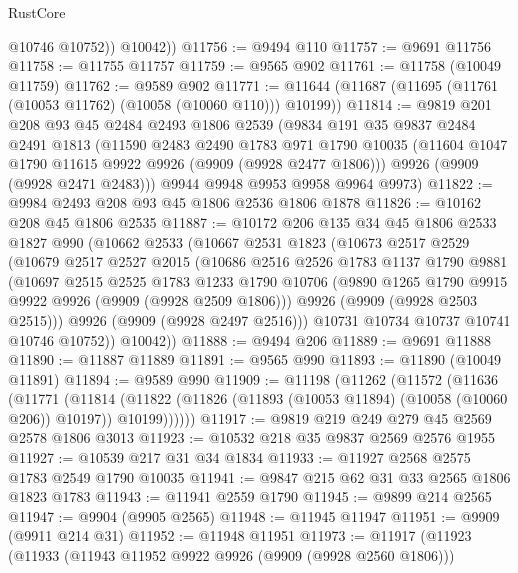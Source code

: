 \begin{lexlean}{RustCore}
\begin{coremodule}
            @10746
            @10752))
        @10042))
@11756 := @9494 @110
@11757 := @9691 @11756
@11758 := @11755 @11757
@11759 := @9565 @902
@11761 := @11758 (@10049 @11759)
@11762 := @9589 @902
@11771 := @11644 (@11687 (@11695 (@11761 (@10053 @11762) (@10058 (@10060 @110))) @10199))
@11814 := @9819
    @201
    @208
    @93
    @45
    @2484
    @2493
    @1806
    @2539
    (@9834
      @191
      @35
      @9837
      @2484
      @2491
      @1813
      (@11590
        @2483
        @2490
        @1783
        @971
        @1790
        @10035
        (@11604 @1047 @1790 @11615 @9922 @9926 (@9909 (@9928 @2477 @1806)))
        @9926
        (@9909 (@9928 @2471 @2483)))
      @9944
      @9948
      @9953
      @9958
      @9964
      @9973)
@11822 := @9984 @2493 @208 @93 @45 @1806 @2536 @1806 @1878
@11826 := @10162 @208 @45 @1806 @2535
@11887 := @10172
    @206
    @135
    @34
    @45
    @1806
    @2533
    @1827
    @990
    (@10662
      @2533
      (@10667
        @2531
        @1823
        (@10673
          @2517
          @2529
          (@10679
            @2517
            @2527
            @2015
            (@10686
              @2516
              @2526
              @1783
              @1137
              @1790
              @9881
              (@10697
                @2515
                @2525
                @1783
                @1233
                @1790
                @10706
                (@9890 @1265 @1790 @9915 @9922 @9926 (@9909 (@9928 @2509 @1806)))
                @9926
                (@9909 (@9928 @2503 @2515)))
              @9926
              (@9909 (@9928 @2497 @2516)))
            @10731
            @10734
            @10737
            @10741
            @10746
            @10752))
        @10042))
@11888 := @9494 @206
@11889 := @9691 @11888
@11890 := @11887 @11889
@11891 := @9565 @990
@11893 := @11890 (@10049 @11891)
@11894 := @9589 @990
@11909 := @11198
    (@11262
      (@11572
        (@11636
          (@11771
            (@11814
              (@11822 (@11826 (@11893 (@10053 @11894) (@10058 (@10060 @206)) @10197)) @10199))))))
@11917 := @9819 @219 @249 @279 @45 @2569 @2578 @1806 @3013
@11923 := @10532 @218 @35 @9837 @2569 @2576 @1955
@11927 := @10539 @217 @31 @34 @1834
@11933 := @11927 @2568 @2575 @1783 @2549 @1790 @10035
@11941 := @9847 @215 @62 @31 @33 @2565 @1806 @1823 @1783
@11943 := @11941 @2559 @1790
@11945 := @9899 @214 @2565
@11947 := @9904 (@9905 @2565)
@11948 := @11945 @11947
@11951 := @9909 (@9911 @214 @31)
@11952 := @11948 @11951
@11973 := @11917
    (@11923
      (@11933
        (@11943 @11952 @9922 @9926 (@9909 (@9928 @2560 @1806)))

\end{coremodule}
\end{lexlean}
